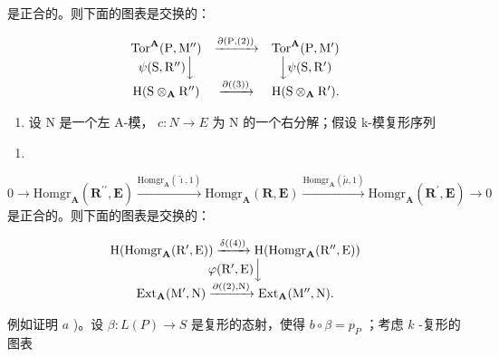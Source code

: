 是正合的。则下面的图表是交换的：

\[
\begin{array}{c c c} \operatorname{Tor} ^ {\mathbf {A}} (\mathrm{P}, \mathrm{M} ^ {\prime \prime}) & \xrightarrow {\partial (\mathrm{P} , (2))} & \operatorname{Tor} ^ {\mathbf {A}} (\mathrm{P}, \mathrm{M} ^ {\prime}) \\ \psi (\mathrm{S}, \mathrm{R} ^ {\prime \prime}) \Big \downarrow & & \Big \downarrow \psi (\mathrm{S}, \mathrm{R} ^ {\prime}) \\ \mathrm{H} (\mathrm{S} \otimes_ {\mathbf {A}} \mathrm{R} ^ {\prime \prime}) & \xrightarrow {\partial ((3))} & \mathrm{H} (\mathrm{S} \otimes_ {\mathbf {A}} \mathrm{R} ^ {\prime}). \end{array}
\]

\begin{enumerate}
\def\labelenumi{\alph{enumi})}
\setcounter{enumi}{1}
\tightlist
\item
  设 N 是一个左 A-模， \(c : N \to E\) 为 N 的一个右分解；假设 k-模复形序列
\end{enumerate}

\begin{enumerate}
\def\labelenumi{(\arabic{enumi})}
\setcounter{enumi}{3}
\tightlist
\item
\end{enumerate}

\(0 \to \text{Homgr}_{\mathbf{A}}(\mathbf{R}^{\prime \prime}, \mathbf{E}) \xrightarrow{\text{Homgr}_{\mathbf{A}}(\tilde{\imath}, 1)} \text{Homgr}_{\mathbf{A}}(\mathbf{R}, \mathbf{E}) \xrightarrow{\text{Homgr}_{\mathbf{A}}(\tilde{\mu}, 1)} \text{Homgr}_{\mathbf{A}}(\mathbf{R}^{\prime}, \mathbf{E}) \to 0\) 是正合的。则下面的图表是交换的：

\[
\begin{array}{c} \mathrm{H} (\operatorname{Homgr} _ {\mathbf {A}} (\mathrm{R} ^ {\prime}, \mathrm{E})) \xrightarrow {\delta ((4))} \mathrm{H} (\operatorname{Homgr} _ {\mathbf {A}} (\mathrm{R} ^ {\prime \prime}, \mathrm{E})) \\ \varphi (\mathrm{R} ^ {\prime}, \mathrm{E}) \Big \downarrow \\ \operatorname{Ext} _ {\mathbf {A}} (\mathrm{M} ^ {\prime}, \mathrm{N}) \xrightarrow {\partial ((2) , \mathrm{N})} \operatorname{Ext} _ {\mathbf {A}} (\mathrm{M} ^ {\prime \prime}, \mathrm{N}). \end{array}
\]

例如证明 \(a\) )。设 \(\beta: L(P) \to S\) 是复形的态射，使得 \(b \circ \beta = p_{P}\) ；考虑 \(k\) -复形的图表

